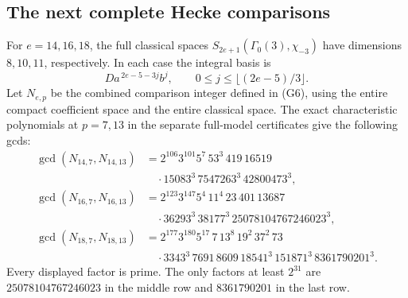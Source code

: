 \subsection{The next complete Hecke comparisons}
\label{sec:hecke-higher2}

\begin{proposition}
\label{prop:hecke-higher2-gl2-derivation}
For $e=14,16,18$, the full classical spaces
$S_{2e+1}(\Gamma_0(3),\chi_{-3})$ have dimensions $8,10,11$,
respectively. In each case the integral basis is
\[
 Da^{\,2e-5-3j}b^j,\qquad 0\le j\le\lfloor(2e-5)/3\rfloor.
\]
Let $N_{e,p}$ be the combined comparison integer defined in (G6),
using the entire compact coefficient space and the entire classical
space. The exact characteristic polynomials at $p=7,13$ in the
separate full-model certificates give the following gcds:
\begin{align*}
\gcd(N_{14,7},N_{14,13})
 &=2^{106}3^{101}5^7\,53^3\,419\,16519\\
 &\quad{}\cdot15083^3\,7547263^3\,42800473^3,\\
\gcd(N_{16,7},N_{16,13})
 &=2^{123}3^{147}5^4\,11^4\,23\,401\,13687\\
 &\quad{}\cdot36293^3\,38177^3\,25078104767246023^3,\\
\gcd(N_{18,7},N_{18,13})
 &=2^{177}3^{180}5^{17}\,7\,13^8\,19^2\,37^2\,73\\
 &\quad{}\cdot3343^3\,7691\,8609\,18541^3\,151871^3
                  \,8361790201^3.
\end{align*}
Every displayed factor is prime. The only factors at least $2^{31}$
are $25078104767246023$ in the middle row and $8361790201$ in the
last row.
\end{proposition}


